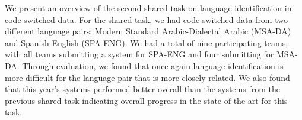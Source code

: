 We present an overview of the second shared task on language identification in code-switched data. For the shared task, we had code-switched data from two different language pairs: Modern Standard Arabic-Dialectal Arabic (MSA-DA) and Spanish-English (SPA-ENG). We had a total of nine participating teams, with all teams submitting a system for SPA-ENG and four submitting for MSA-DA. Through evaluation, we found that once again language identification is more difficult for the language pair that is more closely related. We also found that this year's systems performed better overall than the systems from the previous shared task indicating overall progress in the state of the art for this task.
